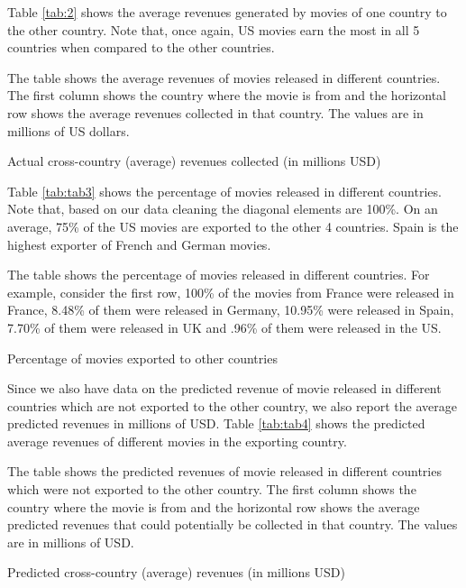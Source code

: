 \documentclass[11pt, letterpaper]{article} \usepackage{amsmath}
\newcommand{\floatintro}[1]{
  
  \vspace*{0.1in}
  
  {\footnotesize

    #1
    
  }
  
  \vspace*{0.1in} } \newcommand{\Hline}{\noindent\rule{18cm}{0.5pt}}
\begin{document}
Table \ref{tab:2} shows the average revenues generated by movies of
one country to the other country. Note that, once again, US movies
earn the most in all 5 countries when compared to the other countries.
\begin{table}[htbp!]
  \floatintro{The table shows the average revenues of movies released
    in different countries. The first column shows the country where
    the movie is from and the horizontal row shows the average
    revenues collected in that country. The values are in millions of
    US dollars.}
  \centering
  
  \caption{Actual cross-country (average) revenues collected (in millions USD)}
  \label{tab:2}
\end{table}
Table \ref{tab:tab3} shows the percentage of movies released in
different countries. Note that, based on our data cleaning the
diagonal elements are 100\%. On an average, 75\% of the US movies are
exported to the other 4 countries. Spain is the highest exporter of
French and German movies. 
\begin{table}[htbp!]
  \floatintro{The table shows the percentage of movies released in
    different countries. For example, consider the first row, 100\% of
    the movies from France were released in France, 8.48\% of them
    were released in Germany, 10.95\% were released in Spain, 7.70\%
    of them were released in UK and .96\% of them were released in the
    US.}
  \centering
  
  \caption{Percentage of movies exported to other countries}
  \label{tab:tab3}
\end{table}
Since we also have data on the predicted revenue of movie released in
different countries which are not exported to the other country, we
also report the average predicted revenues in millions of USD. Table
\ref{tab:tab4} shows the predicted average revenues of different
movies in the exporting country.
\begin{table}[htbp!]
  \floatintro{The table shows the predicted revenues of movie released
    in different countries which were not exported to the other
    country. The first column shows the country where the movie is from
    and the horizontal row shows the average predicted revenues that
    could potentially be collected in that country. The values are in
    millions of USD.}
  \centering
  
  \caption{Predicted cross-country (average) revenues (in millions USD)}
  \label{tab:tab4}
\end{table}
\end{document}
